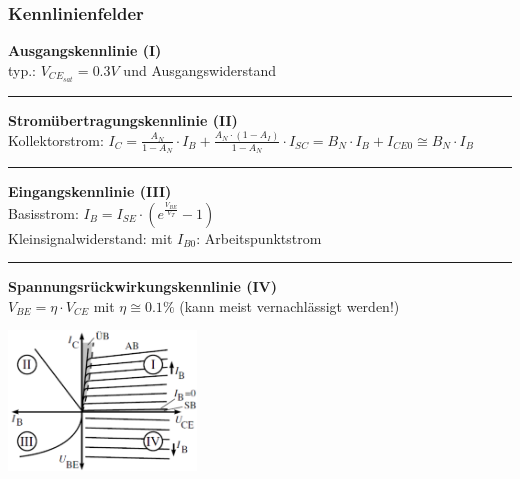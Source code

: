         \subsubsection{Kennlinienfelder}
            \begin{minipage}[T]{14cm}
                {\bf Ausgangskennlinie (I)}\\
                typ.: $V_{CE_{sat}}=0.3V$ und Ausgangswiderstand \\
                \hrule\vspace{1mm}
                {\bf Strom\"ubertragungskennlinie (II)}\\
                Kollektorstrom: $I_C = \frac{A_N}{1-A_N}\cdot I_B + \frac{A_N\cdot (1-A_I)}{1-A_N}\cdot I_{SC} = B_N\cdot I_B + I_{CE0} \cong B_N\cdot I_B$\\
                \hrule\vspace{1mm}
                {\bf Eingangskennlinie (III)}\\
                Basisstrom: $I_B = I_{SE}\cdot\left(e^{\frac{V_{BE}}{V_T}}-1\right)$\\
                Kleinsignalwiderstand:  mit $I_{B0}$: Arbeitspunktstrom\\
                \hrule\vspace{1mm}
                {\bf Spannungsr\"uckwirkungskennlinie (IV)}\\
                $V_{BE} = \eta \cdot V_{CE}$ mit $\eta \cong 0.1 \%$ (kann meist vernachl\"assigt werden!)\\
            \end{minipage}
            \begin{minipage}[T]{5cm}
                \includegraphics[width=5cm]{./bilder/BipTraKennlinien.png}
            \end{minipage}
\newpage

